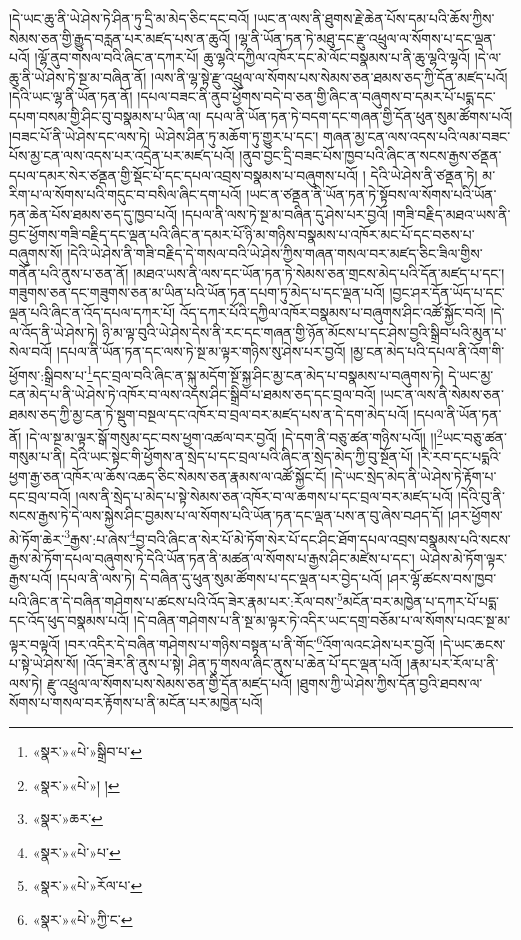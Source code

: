 །དེ་ཡང་ཆུ་ནི་ཡེ་ཤེས་ཏེ་ཤིན་ཏུ་དྲི་མ་མེད་ཅིང་དང་བའོ། །ཡང་ན་ལས་ནི་ཐུགས་རྗེ་ཆེན་པོས་དམ་པའི་ཆོས་ཀྱིས་སེམས་ཅན་གྱི་རྒྱུད་བརླན་པར་མཛད་པས་ན་ཆུའོ། །ལྷ་ནི་ཡོན་ཏན་ཏེ་མཐུ་དང་རྫུ་འཕྲུལ་ལ་སོགས་པ་དང་ལྡན་པའོ། །ལྷོ་ནུབ་གསལ་བའི་ཞིང་ན་དཀར་པོ། ཆུ་ལྷའི་དཀྱིལ་འཁོར་དང་མེ་ལོང་བསྣམས་པ་ནི་ཆུ་ལྷའི་ལྷའོ། །དེ་ལ་ཆུ་ནི་ཡེ་ཤེས་ཏེ་སྔ་མ་བཞིན་ནོ། །ལས་ནི་ལྷ་སྟེ་རྫུ་འཕྲུལ་ལ་སོགས་པས་སེམས་ཅན་ཐམས་ཅད་ཀྱི་དོན་མཛད་པའོ། །དེའི་ཡང་ལྷ་ནི་ཡོན་ཏན་ནོ། །དཔལ་བཟང་ནི་ནུབ་ཕྱོགས་བདེ་བ་ཅན་གྱི་ཞིང་ན་བཞུགས་བ་དམར་པོ་པདྨ་དང་དཔག་བསམ་གྱི་ཤིང་བུ་བསྣམས་པ་ཡིན་ལ། དཔལ་ནི་ཡོན་ཏན་ཏེ་བདག་དང་གཞན་གྱི་དོན་ཕུན་སུམ་ཚོགས་པའོ། །བཟང་པོ་ནི་ཡེ་ཤེས་དང་ལས་ཏེ། ཡེ་ཤེས་ཤིན་ཏུ་མཆོག་ཏུ་གྱུར་པ་དང་། གཞན་མྱ་ངན་ལས་འདས་པའི་ལམ་བཟང་པོས་མྱ་ངན་ལས་འདས་པར་འདྲེན་པར་མཛད་པའོ། །ནུབ་བྱང་དྲི་བཟང་པོས་ཁྱབ་པའི་ཞིང་ན་སངས་རྒྱས་ཙནྡན་དཔལ་དམར་སེར་ཙནྡན་གྱི་སྡོང་པོ་དང་དཔལ་འབྲས་བསྣམས་པ་བཞུགས་པའོ། །
དེའི་ཡེ་ཤེས་ནི་ཙནྡན་ཏེ། མ་རིག་པ་ལ་སོགས་པའི་གདུང་བ་བསིལ་ཞིང་དག་པའོ། །ཡང་ན་ཙནྡན་ནི་ཡོན་ཏན་ཏེ་སྟོབས་ལ་སོགས་པའི་ཡོན་ཏན་ཆེན་པོས་ཐམས་ཅད་དུ་ཁྱབ་པའོ། །དཔལ་ནི་ལས་ཏེ་སྔ་མ་བཞིན་དུ་ཤེས་པར་བྱའོ། །གཟི་བརྗིད་མཐའ་ཡས་ནི་བྱང་ཕྱོགས་གཟི་བརྗིད་དང་ལྡན་པའི་ཞིང་ན་དམར་པོ་ཉི་མ་གཉིས་བསྣམས་པ་འཁོར་མང་པོ་དང་བཅས་པ་བཞུགས་སོ། །དེའི་ཡེ་ཤེས་ནི་གཟི་བརྗིད་དེ་གསལ་བའི་ཡེ་ཤེས་ཀྱིས་གཞན་གསལ་བར་མཛད་ཅིང་ཟིལ་གྱིས་གནོན་པའི་ནུས་པ་ཅན་ནོ། །མཐའ་ཡས་ནི་ལས་དང་ཡོན་ཏན་ཏེ་སེམས་ཅན་གྲངས་མེད་པའི་དོན་མཛད་པ་དང་། གཟུགས་ཅན་དང་གཟུགས་ཅན་མ་ཡིན་པའི་ཡོན་ཏན་དཔག་ཏུ་མེད་པ་དང་ལྡན་པའོ། །བྱང་ཤར་དོན་ཡོད་པ་དང་ལྡན་པའི་ཞིང་ན་འོད་དཔལ་དཀར་པོ། འོད་དཀར་པོའི་དཀྱིལ་འཁོར་བསྣམས་པ་བཞུགས་ཤིང་འཚོ་སྐྱོང་བའོ། །དེ་ལ་འོད་ནི་ཡེ་ཤེས་ཏེ། ཉི་མ་ལྟ་བུའི་ཡེ་ཤེས་དེས་ནི་རང་དང་གཞན་གྱི་ཉོན་མོངས་པ་དང་ཤེས་བྱའི་སྒྲིབ་པའི་མུན་པ་སེལ་བའོ། །དཔལ་ནི་ཡོན་ཏན་དང་ལས་ཏེ་སྔ་མ་ལྟར་གཉིས་སུ་ཤེས་པར་བྱའོ། །མྱ་ངན་མེད་པའི་དཔལ་ནི་འོག་གི་ཕྱོགས་:སྒྲིབས་པ་\footnote{«སྣར་»«པེ་»སྒྲིབ་པ་}དང་བྲལ་བའི་ཞིང་ན་སྐུ་མདོག་སྔོ་སྐྱ་ཤིང་མྱ་ངན་མེད་པ་བསྣམས་པ་བཞུགས་ཏེ། དེ་ཡང་མྱ་ངན་མེད་པ་ནི་ཡེ་ཤེས་ཏེ་འཁོར་བ་ལས་འདས་ཤིང་སྒྲིབ་པ་ཐམས་ཅད་དང་བྲལ་བའོ། །ཡང་ན་ལས་ནི་སེམས་ཅན་ཐམས་ཅད་ཀྱི་མྱ་ངན་ཏེ་སྡུག་བསྔལ་དང་འཁོར་བ་བྲལ་བར་མཛད་པས་ན་དེ་དག་མེད་པའོ། །དཔལ་ནི་ཡོན་ཏན་ནོ། །དེ་ལ་སྔ་མ་ལྟར་སྒོ་གསུམ་དང་བས་ཕྱག་འཚལ་བར་བྱའོ། །དེ་དག་ནི་བཅུ་ཚན་གཉིས་པའོ།། །།\footnote{«སྣར་»«པེ་»། །}ཡང་བཅུ་ཚན་གསུམ་པ་ནི། དེའི་ཡང་སྟེང་གི་ཕྱོགས་ན་སྲེད་པ་དང་བྲལ་པའི་ཞིང་ན་སྲེད་མེད་ཀྱི་བུ་སྔོན་པོ། །རི་རབ་དང་པདྨའི་ཕྱག་རྒྱ་ཅན་འཁོར་ལ་ཆོས་འཆད་ཅིང་སེམས་ཅན་རྣམས་ལ་འཚོ་སྐྱོང་ངོ། །དེ་ཡང་སྲེད་མེད་ནི་ཡེ་ཤེས་ཏེ་རྟོག་པ་དང་བྲལ་བའོ། །ལས་ནི་སྲེད་པ་མེད་པ་སྟེ་སེམས་ཅན་འཁོར་བ་ལ་ཆགས་པ་དང་བྲལ་བར་མཛད་པའོ། །དེའི་བུ་ནི་སངས་རྒྱས་ཏེ་དེ་ལས་སྐྱེས་ཤིང་བྱམས་པ་ལ་སོགས་པའི་ཡོན་ཏན་དང་ལྡན་པས་ན་བུ་ཞེས་བཤད་དོ། །ཤར་ཕྱོགས་མེ་ཏོག་ཆེར་\footnote{«སྣར་»ཆར་}རྒྱས་:པ་ཞེས་\footnote{«སྣར་»«པེ་»པ་}བྱ་བའི་ཞིང་ན་སེར་པོ་མེ་ཏོག་སེར་པོ་དང་ཤིང་ཐོག་དཔལ་འབྲས་བསྣམས་པའི་སངས་རྒྱས་མེ་ཏོག་དཔལ་བཞུགས་ཏེ་དེའི་ཡོན་ཏན་ནི་མཚན་ལ་སོགས་པ་རྒྱས་ཤིང་མཛེས་པ་དང་། ཡེ་ཤེས་མེ་ཏོག་ལྟར་རྒྱས་པའོ། །དཔལ་ནི་ལས་ཏེ། དེ་བཞིན་དུ་ཕུན་སུམ་ཚོགས་པ་དང་ལྡན་པར་བྱེད་པའོ། །ཤར་ལྷོ་ཚངས་བས་ཁྱབ་པའི་ཞིང་ན་དེ་བཞིན་གཤེགས་པ་ཚངས་པའི་འོད་ཟེར་རྣམ་པར་:རོལ་བས་\footnote{«སྣར་»«པེ་»རོལ་པ་}མངོན་བར་མཁྱེན་པ་དཀར་པོ་པདྨ་དང་འོད་ཕུད་བསྣམས་པའོ། །དེ་བཞིན་གཤེགས་པ་ནི་སྔ་མ་ལྟར་ཏེ་འདིར་ཡང་དགྲ་བཅོམ་པ་ལ་སོགས་པའང་སྔ་མ་ལྟར་བལྟའོ། །བར་འདིར་དེ་བཞིན་གཤེགས་པ་གཉིས་བསྟན་པ་ནི་གོང་\footnote{«སྣར་»«པེ་»ཀྱི་ང་}འོག་ལའང་ཤེས་པར་བྱའོ། །དེ་ཡང་ཆངས་པ་སྟེ་ཡེ་ཤེས་སོ། །འོད་ཟེར་ནི་ནུས་པ་སྟེ། ཤིན་ཏུ་གསལ་ཞིང་ནུས་པ་ཆེན་པོ་དང་ལྡན་པའོ། །རྣམ་པར་རོལ་པ་ནི་ལས་ཏེ། རྫུ་འཕྲུལ་ལ་སོགས་པས་སེམས་ཅན་གྱི་དོན་མཛད་པའོ། །ཐུགས་ཀྱི་ཡེ་ཤེས་ཀྱིས་དོན་བྱའི་ཐབས་ལ་སོགས་པ་གསལ་བར་རྟོགས་པ་ནི་མངོན་པར་མཁྱེན་པའོ། 